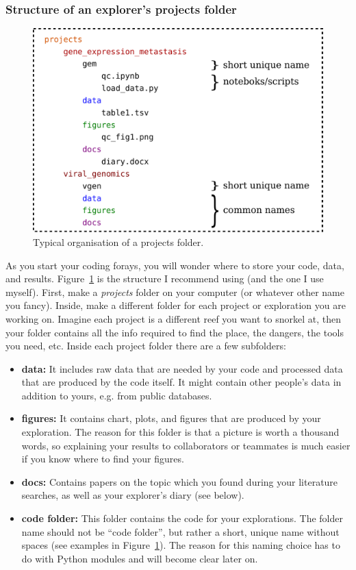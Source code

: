 \documentclass[12pt,a4paper,notitlepage,onecolumn]{article}
\begin{document}
\subsubsection{Structure of an explorer's projects folder}
\begin{figure}
\begin{center}
\includegraphics[width=0.7\linewidth]{folder_org.pdf}
\caption{Typical organisation of a projects folder.}
\label{fig:projorg}
\end{center}
\end{figure}
As you start your coding forays, you will wonder where to store your code, data, and results. Figure~\ref{fig:projorg} is the structure I recommend using (and the one I use myself). First, make a \textit{projects} folder on your computer (or whatever other name you fancy). Inside, make a different folder for each project or exploration you are working on. Imagine each project is a different reef you want to snorkel at, then your folder contains all the info required to find the place, the dangers, the tools you need, etc. Inside each project folder there are a few subfolders:

\begin{itemize}
\item \textbf{data:} It includes raw data that are needed by your code and processed data that are produced by the code itself. It might contain other people's data in addition to yours, e.g. from public databases.
\item \textbf{figures:} It contains chart, plots, and figures that are produced by your exploration. The reason for this folder is that a picture is worth a thousand words, so explaining your results to collaborators or teammates is much easier if you know where to find your figures.
\item \textbf{docs:} Contains papers on the topic which you found during your literature searches, as well as your explorer's diary (see below).
\item \textbf{code folder:} This folder contains the code for your explorations. The folder name should not be ``code folder'', but rather a short, unique name without spaces (see examples in Figure~\ref{fig:projorg}). The reason for this naming choice has to do with Python modules and will become clear later on.
\end{itemize}
\end{document}
